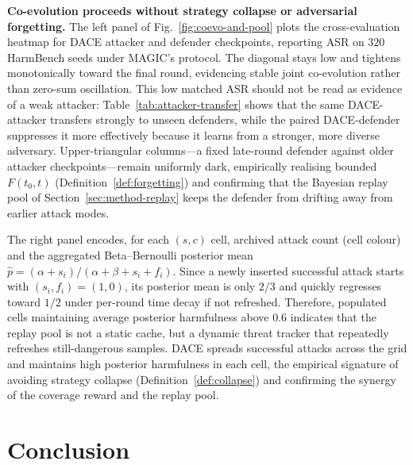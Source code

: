 \documentclass{article}
\newcommand{\method}{\textsc{DACE}\xspace}
\begin{document}
\textbf{Co-evolution proceeds without strategy collapse or adversarial forgetting.} The left panel of Fig.~\ref{fig:coevo-and-pool} plots the cross-evaluation heatmap for \method attacker and defender checkpoints, reporting ASR on $320$ HarmBench seeds under MAGIC's protocol. The diagonal stays low and tightens monotonically toward the final round, evidencing stable joint co-evolution rather than zero-sum oscillation. This low matched ASR should not be read as evidence of a weak attacker: Table~\ref{tab:attacker-transfer} shows that the same \method-attacker transfers strongly to unseen defenders, while the paired \method-defender suppresses it more effectively because it learns from a stronger, more diverse adversary. Upper-triangular columns---a fixed late-round defender against older attacker checkpoints---remain uniformly dark, empirically realising bounded $F(t_0,t)$ (Definition~\ref{def:forgetting}) and confirming that the Bayesian replay pool of Section~\ref{sec:method-replay} keeps the defender from drifting away from earlier attack modes. 

The right panel encodes, for each $(s, c)$ cell, archived attack count (cell colour) and the aggregated Beta--Bernoulli posterior mean $\hat p = (\alpha + s_i)/(\alpha + \beta + s_i + f_i)$. Since a newly inserted successful attack starts with $(s_i,f_i)=(1,0)$, its posterior mean is only $2/3$ and quickly regresses toward $1/2$ under per-round time decay if not refreshed. Therefore, populated cells maintaining average posterior harmfulness above $0.6$ indicates that the replay pool is not a static cache, but a dynamic threat tracker that repeatedly refreshes still-dangerous samples. \method spreads successful attacks across the grid and maintains high posterior harmfulness in each cell, the empirical signature of avoiding strategy collapse (Definition~\ref{def:collapse}) and confirming the synergy of the coverage reward and the replay pool.





\section{Conclusion}
\label{sec:conclusion}
\end{document}
